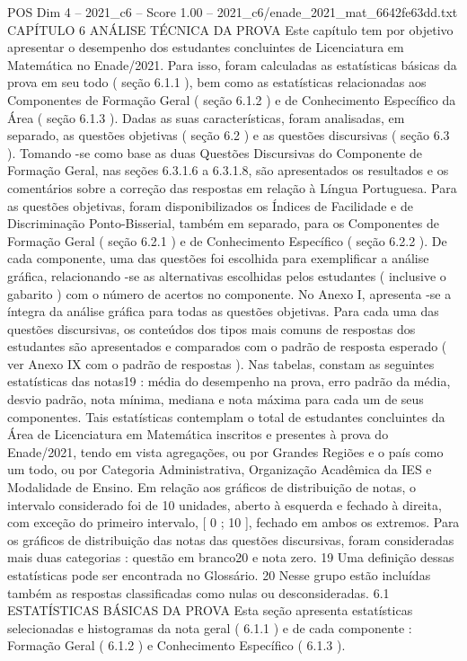 \begin{textsample}{POS Dim 4 – 2021\_c6 – Score 1.00 – 2021\_c6/enade\_2021\_mat\_6642fe63dd.txt}  \label{ex:f4_pos_069}
CAPÍTULO 6 ANÁLISE TÉCNICA DA PROVA Este capítulo tem por objetivo apresentar o desempenho dos estudantes concluintes de Licenciatura em Matemática no Enade/2021.
Para isso, foram calculadas as estatísticas básicas da prova em seu todo ( seção 6.1.1 ), bem como as estatísticas relacionadas aos Componentes de Formação Geral ( seção 6.1.2 ) e de Conhecimento Específico da Área ( seção 6.1.3 ).
Dadas as suas características, foram analisadas, em separado, as questões objetivas ( seção 6.2 ) e as questões discursivas ( seção 6.3 ).
Tomando -se como base as duas Questões Discursivas do Componente de Formação Geral, nas seções 6.3.1.6 a 6.3.1.8, são apresentados os resultados e os comentários sobre a correção das respostas em relação à Língua Portuguesa.
Para as questões objetivas, foram disponibilizados os Índices de Facilidade e de Discriminação Ponto-Bisserial, também em separado, para os Componentes de Formação Geral ( seção 6.2.1 ) e de Conhecimento Específico ( seção 6.2.2 ).
De cada componente, uma das questões foi escolhida para exemplificar a análise gráfica, relacionando -se as alternativas escolhidas pelos estudantes ( inclusive o gabarito ) com o número de acertos no componente.
No Anexo I, apresenta -se a íntegra da análise gráfica para todas as questões objetivas.
Para cada uma das questões discursivas, os conteúdos dos tipos mais comuns de respostas dos estudantes são apresentados e comparados com o padrão de resposta esperado ( ver Anexo IX com o padrão de respostas ).
Nas tabelas, constam as seguintes estatísticas das notas19 : média do desempenho na prova, erro padrão da média, desvio padrão, nota mínima, mediana e nota máxima para cada um de seus componentes.
Tais estatísticas contemplam o total de estudantes concluintes da Área de Licenciatura em Matemática inscritos e presentes à prova do Enade/2021, tendo em vista agregações, ou por Grandes Regiões e o país como um todo, ou por Categoria Administrativa, Organização Acadêmica da IES e Modalidade de Ensino.
Em relação aos gráficos de distribuição de notas, o intervalo considerado foi de 10 unidades, aberto à esquerda e fechado à direita, com exceção do primeiro intervalo, [ 0 ; 10 ], fechado em ambos os extremos.
Para os gráficos de distribuição das notas das questões discursivas, foram consideradas mais duas categorias : questão em branco20 e nota zero. 19 Uma definição dessas estatísticas pode ser encontrada no Glossário. 20 Nesse grupo estão incluídas também as respostas classificadas como nulas ou desconsideradas. 6.1 ESTATÍSTICAS BÁSICAS DA PROVA Esta seção apresenta estatísticas selecionadas e histogramas da nota geral ( 6.1.1 ) e de cada componente : Formação Geral ( 6.1.2 ) e Conhecimento Específico ( 6.1.3 ).

\end{textsample}
